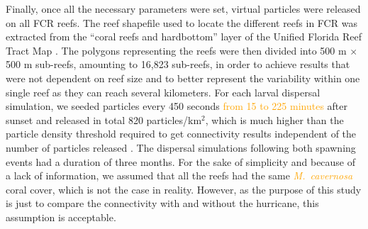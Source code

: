 \documentclass[fleqn,10pt]{wlscirep}
\newcommand{\modif}[1]{\textcolor{orange}{#1}}
\begin{document}
Finally, once all the necessary parameters were set, virtual particles were released on all FCR reefs. The reef shapefile used to locate the different reefs in FCR was extracted from the “coral reefs and hardbottom” layer of the Unified Florida Reef Tract Map \citep{FWC2017Jan}. The polygons representing the reefs were then divided into 500 m $\times$ 500 m sub-reefs, amounting to 16,823 sub-reefs, in order to achieve results that were not dependent on reef size and to better represent the variability within one single reef as they can reach several kilometers. For each larval dispersal simulation, we seeded particles every 450 seconds \modif{from 15 to 225 minutes} after sunset and released in total 820 particles/km$^{2}$, which is much higher than the particle density threshold required to get connectivity results independent of the number of particles released \citep{Monroy2017Jan}. The dispersal simulations following both spawning events had a duration of three months. For the sake of simplicity and because of a lack of information, we assumed that all the reefs had the same \modif{\it M.~cavernosa} coral cover, which is not the case in reality. However, as the purpose of this study is just to compare the connectivity with and without the hurricane, this assumption is acceptable.
\end{document}
